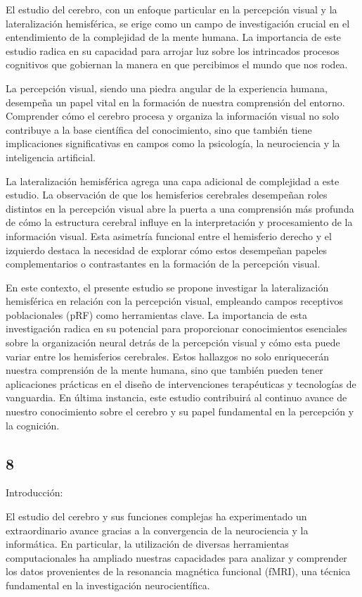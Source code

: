 \documentclass[12pt,oneside]{uhthesis}
\begin{document}
El estudio del cerebro, con un enfoque particular en la percepción visual y la lateralización hemisférica, se erige como un campo de investigación crucial en el entendimiento de la complejidad de la mente humana. La importancia de este estudio radica en su capacidad para arrojar luz sobre los intrincados procesos cognitivos que gobiernan la manera en que percibimos el mundo que nos rodea.

La percepción visual, siendo una piedra angular de la experiencia humana, desempeña un papel vital en la formación de nuestra comprensión del entorno. Comprender cómo el cerebro procesa y organiza la información visual no solo contribuye a la base científica del conocimiento, sino que también tiene implicaciones significativas en campos como la psicología, la neurociencia y la inteligencia artificial.

La lateralización hemisférica agrega una capa adicional de complejidad a este estudio. La observación de que los hemisferios cerebrales desempeñan roles distintos en la percepción visual abre la puerta a una comprensión más profunda de cómo la estructura cerebral influye en la interpretación y procesamiento de la información visual. Esta asimetría funcional entre el hemisferio derecho y el izquierdo destaca la necesidad de explorar cómo estos desempeñan papeles complementarios o contrastantes en la formación de la percepción visual.

En este contexto, el presente estudio se propone investigar la lateralización hemisférica en relación con la percepción visual, empleando campos receptivos poblacionales (pRF) como herramientas clave. La importancia de esta investigación radica en su potencial para proporcionar conocimientos esenciales sobre la organización neural detrás de la percepción visual y cómo esta puede variar entre los hemisferios cerebrales. Estos hallazgos no solo enriquecerán nuestra comprensión de la mente humana, sino que también pueden tener aplicaciones prácticas en el diseño de intervenciones terapéuticas y tecnologías de vanguardia. En última instancia, este estudio contribuirá al continuo avance de nuestro conocimiento sobre el cerebro y su papel fundamental en la percepción y la cognición.

\subsection{8}

Introducción:

El estudio del cerebro y sus funciones complejas ha experimentado un extraordinario avance gracias a la convergencia de la neurociencia y la informática. En particular, la utilización de diversas herramientas computacionales ha ampliado nuestras capacidades para analizar y comprender los datos provenientes de la resonancia magnética funcional (fMRI), una técnica fundamental en la investigación neurocientífica.
\end{document}
